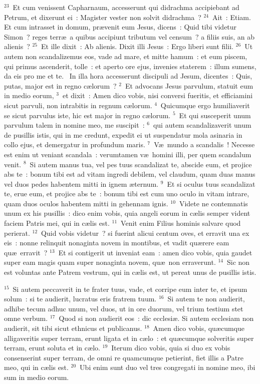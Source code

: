 ${}^{23}$~Et cum venissent Capharnaum, accesserunt qui didrachma accipiebant ad Petrum, et dixerunt ei~: Magister vester non solvit didrachma~?
${}^{24}$~Ait~: Etiam. Et cum intrasset in domum, pr\ae venit eum Jesus, dicens~: Quid tibi videtur Simon~? reges terr\ae\ a quibus accipiunt tributum vel censum~? a filiis suis, an ab alienis~?
${}^{25}$~Et ille dixit~: Ab alienis. Dixit illi Jesus~: Ergo liberi sunt filii.
${}^{26}$~Ut autem non scandalizemus eos, vade ad mare, et mitte hamum~: et eum piscem, qui primus ascenderit, tolle~: et aperto ore ejus, invenies staterem~: illum sumens, da eis pro me et te.
~In illa hora accesserunt discipuli ad Jesum, dicentes~: Quis, putas, major est in regno c\ae lorum~?
${}^{2}$~Et advocans Jesus parvulum, statuit eum in medio eorum,
${}^{3}$~et dixit~: Amen dico vobis, nisi conversi fueritis, et efficiamini sicut parvuli, non intrabitis in regnum c\ae lorum.
${}^{4}$~Quicumque ergo humiliaverit se sicut parvulus iste, hic est major in regno c\ae lorum.
${}^{5}$~Et qui susceperit unum parvulum talem in nomine meo, me suscipit~:
${}^{6}$~qui autem scandalizaverit unum de pusillis istis, qui in me credunt, expedit ei ut suspendatur mola asinaria in collo ejus, et demergatur in profundum maris.
${}^{7}$~V\ae\ mundo a scandalis~! Necesse est enim ut veniant scandala~: verumtamen v\ae\ homini illi, per quem scandalum venit.
${}^{8}$~Si autem manus tua, vel pes tuus scandalizat te, abscide eum, et projice abs te~: bonum tibi est ad vitam ingredi debilem, vel claudum, quam duas manus vel duos pedes habentem mitti in ignem \ae ternum.
${}^{9}$~Et si oculus tuus scandalizat te, erue eum, et projice abs te~: bonum tibi est cum uno oculo in vitam intrare, quam duos oculos habentem mitti in gehennam ignis.
${}^{10}$~Videte ne contemnatis unum ex his pusillis~: dico enim vobis, quia angeli eorum in c\ae lis semper vident faciem Patris mei, qui in c\ae lis est.
${}^{11}$~Venit enim Filius hominis salvare quod perierat.
${}^{12}$~Quid vobis videtur~? si fuerint alicui centum oves, et erravit una ex eis~: nonne relinquit nonaginta novem in montibus, et vadit qu\ae rere eam qu\ae\ erravit~?
${}^{13}$~Et si contigerit ut inveniat eam~: amen dico vobis, quia gaudet super eam magis quam super nonaginta novem, qu\ae\ non erraverunt.
${}^{14}$~Sic non est voluntas ante Patrem vestrum, qui in c\ae lis est, ut pereat unus de pusillis istis.


${}^{15}$~Si autem peccaverit in te frater tuus, vade, et corripe eum inter te, et ipsum solum~: si te audierit, lucratus eris fratrem tuum.
${}^{16}$~Si autem te non audierit, adhibe tecum adhuc unum, vel duos, ut in ore duorum, vel trium testium stet omne verbum.
${}^{17}$~Quod si non audierit eos~: dic ecclesi\ae . Si autem ecclesiam non audierit, sit tibi sicut ethnicus et publicanus.
${}^{18}$~Amen dico vobis, qu\ae cumque alligaveritis super terram, erunt ligata et in c\ae lo~: et qu\ae cumque solveritis super terram, erunt soluta et in c\ae lo.
${}^{19}$~Iterum dico vobis, quia si duo ex vobis consenserint super terram, de omni re quamcumque petierint, fiet illis a Patre meo, qui in c\ae lis est.
${}^{20}$~Ubi enim sunt duo vel tres congregati in nomine meo, ibi sum in medio eorum.


